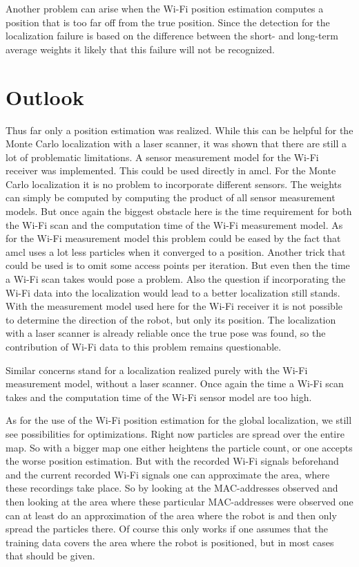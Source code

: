 Another problem can arise when the Wi-Fi position estimation computes a position that is too far off from the true position. Since the detection for the localization failure is based on the difference between the short- and long-term average weights it likely that this failure will not be recognized.

\section{Outlook}
Thus far only a position estimation was realized. While this can be helpful for the Monte Carlo localization with a laser scanner, it was shown that there are still a lot of problematic limitations. A sensor measurement model for the Wi-Fi receiver was implemented. This could be used directly in amcl. For the Monte Carlo localization it is no problem to incorporate different sensors. The weights can simply be computed by computing the product of all sensor measurement models. But once again the biggest obstacle here is the time requirement for both the Wi-Fi scan and the computation time of the Wi-Fi measurement model. As for the Wi-Fi measurement model this problem could be eased by the fact that amcl uses a lot less particles when it converged to a position. Another trick that could be used is to omit some access points per iteration. But even then the time a Wi-Fi scan takes would pose a problem. Also the question if incorporating the Wi-Fi data into the localization would lead to a better localization still stands. With the measurement model used here for the Wi-Fi receiver it is not possible to determine the direction of the robot, but only its position. The localization with a laser scanner is already reliable once the true pose was found, so the contribution of Wi-Fi data to this problem remains questionable. 

Similar concerns stand for a localization realized purely with the Wi-Fi measurement model, without a laser scanner. Once again the time a Wi-Fi scan takes and the computation time of the Wi-Fi sensor model are too high. 

As for the use of the Wi-Fi position estimation for the global localization, we still see possibilities for optimizations. Right now particles are spread over the entire map. So with a bigger map one either heightens the particle count, or one accepts the worse position estimation. But with the recorded Wi-Fi signals beforehand and the current recorded Wi-Fi signals one can approximate the area, where these recordings take place. So by looking at the MAC-addresses observed and then looking at the area where these particular MAC-addresses were observed one can at least do an approximation of the area where the robot is and then only spread the particles there. Of course this only works if one assumes that the training data covers the area where the robot is positioned, but in most cases that should be given. 